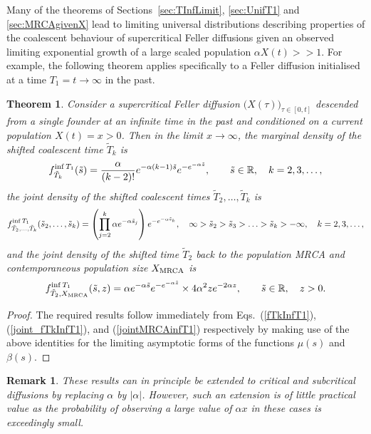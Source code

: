 \documentclass[preprint,12pt]{elsarticle}
\newtheorem{theorem}{Theorem}
\newtheorem{remark}{Remark}
\begin{document}
Many of the theorems of Sections~\ref{sec:TInfLimit}, \ref{sec:UnifT1} and \ref{sec:MRCAgivenX} lead to limiting 
universal distributions describing properties of the coalescent behaviour of supercritical Feller diffusions given an observed limiting exponential 
growth of a large scaled population $\alpha X(t) >> 1$.  For example, the following theorem applies specifically to a Feller diffusion initialised 
at a time $T_1 = t \to \infty$ in the past.
\begin{theorem}	\label{theorem:LargeXDistribs}
Consider a supercritical Feller diffusion $\big(X(\tau)\big)_{\tau \in [0, t]}$ descended from a single founder at 
an infinite time in the past and conditioned on a current population $X(t) = x > 0$.  
Then in the limit $x \to \infty$, the marginal density of the shifted coalescent time $\tilde{T}_k$ is  
\[
f_{\tilde{T}_k}^{{\rm inf}\,T_1}(\tilde{s}) 
	= \frac{\alpha}{(k - 2)!} e^{-\alpha(k - 1)\tilde{s}} e^{-e^{-\alpha \tilde{s}}}, \qquad \tilde{s} \in \mathbb{R}, \quad k = 2, 3, \ldots, 
\]
the joint density of the shifted coalescent times $\tilde{T}_2, \ldots, \tilde{T}_k$ is  
\[
f_{\tilde{T}_2, \ldots, \tilde{T}_k}^{{\rm inf}\,T_1}(\tilde{s}_2, \ldots, \tilde{s}_k) =
	\left(\prod_{j = 2}^k \alpha e^{-\alpha \tilde{s}_j}\right) e^{-e^{-\alpha \tilde{s}_k}}, 
									\quad \infty > \tilde{s}_2 > \tilde{s}_3 > \ldots > \tilde{s}_k > -\infty, \quad k = 2, 3, \ldots,
\]
and the joint density of the shifted time $\tilde{T}_2$ back to the population MRCA and contemporaneous 
population size $X_{\rm MRCA}$ is 
\begin{equation} \label{jointT2tildeXMRCA}
f_{\tilde{T}_2,X_{\rm MRCA}}^{{\rm inf}\,T_1}(\tilde{s}, z) 
		= \alpha e^{-\alpha \tilde{s}} e^{-e^{-\alpha \tilde{s}}}\times 4\alpha^2ze^{-2\alpha z}, \qquad \tilde{s} \in \mathbb{R}, \quad z > 0.
\end{equation}
\end{theorem}
%
 \begin{proof}
 The required results follow immediately from Eqs.~(\ref{fTkInfT1}), (\ref{joint_fTkInfT1}), and (\ref{jointMRCAinfT1})  respectively 
by making use of the above identities for the limiting asymptotic forms of the functions $\mu(s)$ and $\beta(s)$.  
\end{proof}
\begin{remark}
These results can in principle be extended to critical and subcritical diffusions by replacing $\alpha$ by $|\alpha|$.  However, such an extension 
is of little practical value as the probability of observing a large value of $\alpha x$ in these cases is exceedingly small.
\end{remark}
%
\end{document}
